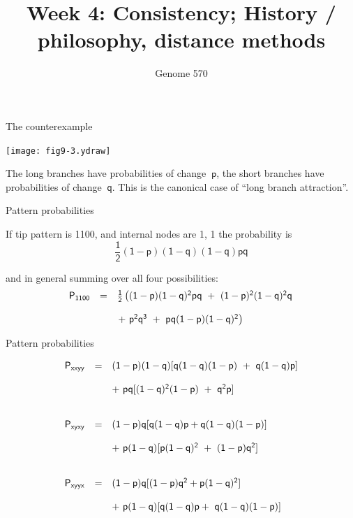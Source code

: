 \documentclass[bluish,slideColor,colorBG,pdf]{prosper}
\title{Week 4:  Consistency; History / philosophy, distance methods}
\author{Genome 570}
\begin{document}
\maketitle

\begin{slide}[Replace]{The counterexample}

\centerline{\texttt{[image: fig9-3.ydraw]}}
\bigskip

The long branches have probabilities of change $\ \mathsf{p}$, the short
branches have probabilities of change $\ \mathsf{q}$.  This is the canonical
case of ``long branch attraction''.

\end{slide}

\begin{slide}[Replace]{Pattern probabilities}

If tip pattern is 1100, and internal nodes are 1, 1 the probability is
\[
\mathsf{\frac{1}{2}(1-p)(1-q)(1-q)pq}
\]

and in general summing over all four possibilities:
\[
\begin{array}{c c l}
\mathsf{P_{1100}} & \mathsf{=} &  \mathsf{\frac{1}{2}\left((1-p)(1-q)^2pq\ +\ (1-p)^2(1-q)^2q\right.}\\
& & \\
  & & \mathsf{\left.+\ p^2q^3\ +\ pq(1-p)(1-q)^2\right)}
\end{array}
\]

\end{slide}

\begin{slide}[Replace]{Pattern probabilities}

\noindent
\[
\begin{array}{c c l}
\mathsf{P_{xxyy}} &  \mathsf{=} &  \mathsf{(1-p)(1-q)[q(1-q)(1-p)\ +\ q(1-q)p]}\\\
& & \\
& &  \mathsf{+\  pq[(1-q)^2(1-p)\ +\ q^2p]} \\
& & \\
& & \\
\mathsf{P_{xyxy}} & \mathsf{=} & \mathsf{(1-p)q[q(1-q)p+q(1-q)(1-p)]}\\
& & \\
 & & \mathsf{+\ p(1-q)[p(1-q)^2\ +\ (1-p)q^2]} \\
& & \\
& & \\
\mathsf{P_{xyyx}} & \mathsf{=} &  \mathsf{(1-p)q[(1-p)q^2+p(1-q)^2]}\\
& & \\
 & &\mathsf{+\ p(1-q)[q(1-q)p +\ q(1-q)(1-p)]}
\end{array}
\]
 
\end{slide}
\end{document}
